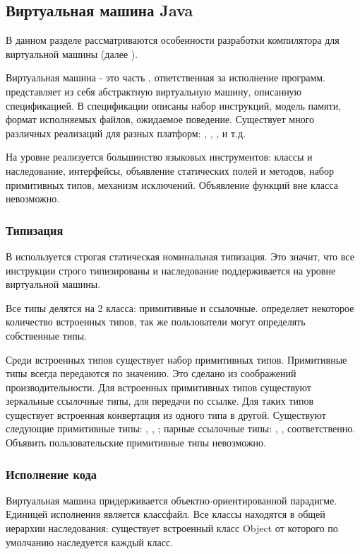 \subsection{Виртуальная машина Java}
В данном разделе рассматриваются особенности разработки компилятора для виртуальной машины (далее ).

Виртуальная машина  - это часть , ответственная за исполнение программ.  представляет из себя абстрактную виртуальную машину, описанную спецификацией\cite{jvm:specification}. В спецификации описаны набор инструкций, модель памяти, формат исполняемых файлов, ожидаемое поведение. Существует много различных реализаций  для разных платформ: , , ,  и т.д.

На уровне  реализуется большинство языковых инструментов: классы и наследование, интерфейсы, объявление статических полей и методов, набор примитивных типов, механизм исключений. Объявление функций вне класса невозможно.

\subsubsection{Типизация}
В  используется строгая статическая номинальная типизация. Это значит, что все инструкции строго типизированы и наследование поддерживается на уровне виртуальной машины.

Все типы делятся на 2 класса: примитивные и ссылочные.  определяет некоторое количество встроенных типов, так же пользователи могут определять собственные типы.

Среди встроенных типов существует набор примитивных типов. Примитивные типы всегда передаются по значению. Это сделано из соображений производительности. Для встроенных примитивных типов существуют зеркальные ссылочные типы, для передачи по ссылке. Для таких типов существует встроенная конвертация из одного типа в другой. Существуют следующие примитивные типы: , , ; парные ссылочные типы: , ,  соответственно. Объявить пользовательские примитивные типы невозможно.

\subsubsection{Исполнение кода}
Виртуальная машина  придерживается объектно-ориентированной парадигме. Единицей исполнения является классфайл. Все классы находятся в общей иерархии наследования: существует встроенный класс Object от которого по умолчанию наследуется каждый класс.

